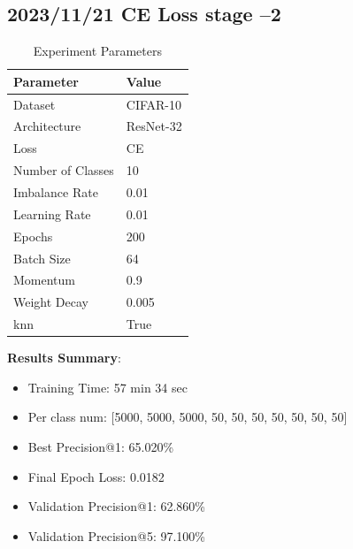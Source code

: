 \documentclass{article}
\begin{document}
\begin{multicols}{2} %
\section{2023/11/21 CE Loss stage --2}
\begin{table}[H]
\centering
\caption{Experiment Parameters}
\label{tab:parameters}
\begin{tabular}{ll}
\toprule
Parameter & Value \\
\midrule
Dataset & CIFAR-10 \\
Architecture & ResNet-32 \\
Loss & CE \\
Number of Classes & 10 \\
Imbalance Rate & 0.01 \\
Learning Rate & 0.01 \\
Epochs & 200 \\
Batch Size & 64 \\
Momentum & 0.9 \\
Weight Decay & 0.005 \\
knn & True \\
\bottomrule
\end{tabular}
\end{table}

\textbf{Results Summary}:
\begin{itemize}
    \item Training Time: 57 min 34 sec
    \item Per class num: [5000, 5000, 5000, 50, 50, 50, 50, 50, 50, 50]
    \item Best Precision@1: 65.020\%  
    \item Final Epoch Loss: 0.0182 
    \item Validation Precision@1: 62.860\%
    \item Validation Precision@5: 97.100\%
\end{itemize}


\end{multicols}
\end{document}
